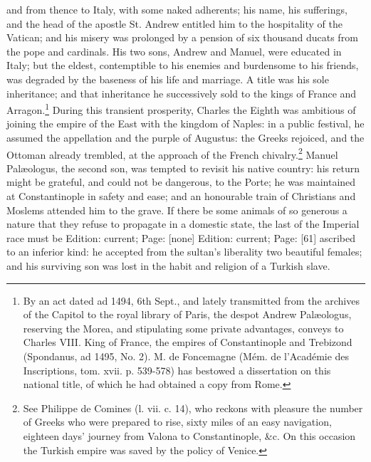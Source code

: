 and from thence to Italy, with some naked adherents; his name, his sufferings, and the head of the apostle St. Andrew entitled him to the hospitality of the Vatican; and his misery was prolonged by a pension of six thousand ducats from the pope and cardinals. His two sons, Andrew and Manuel, were educated in Italy; but the eldest, contemptible to his enemies and burdensome to his friends, was degraded by the baseness of his life and marriage. A title was his sole inheritance; and that inheritance he successively sold to the kings of France and Arragon.\footnote{By an act dated ad 1494, 6th Sept., and lately transmitted from the archives of the Capitol to the royal library of Paris, the despot Andrew Palæologus, reserving the Morea, and stipulating some private advantages, conveys to Charles VIII. King of France, the empires of Constantinople and Trebizond (Spondanus, ad 1495, No. 2). M. de Foncemagne (Mém. de l\texthebrew{}’Académie des Inscriptions, tom. xvii. p. 539-578) has bestowed a dissertation on this national title, of which he had obtained a copy from Rome.} During this transient prosperity, Charles the Eighth was ambitious of joining the empire of the East with the kingdom of Naples: in a public festival, he assumed the appellation and the purple of Augustus: the Greeks rejoiced, and the Ottoman already trembled, at the approach of the French chivalry.\footnote{See Philippe de Comines (l. vii. c. 14), who reckons with pleasure the number of Greeks who were prepared to rise, sixty miles of an easy navigation, eighteen days\texthebrew{}’ journey from Valona to Constantinople, \&c. On this occasion the Turkish empire was saved by the policy of Venice.} Manuel Palæologus, the second son, was tempted to revisit his native country: his return might be grateful, and could not be dangerous, to the Porte; he was maintained at Constantinople in safety and ease; and an honourable train of Christians and Moslems attended him to the grave. If there be some animals of so generous a nature that they refuse to propagate in a domestic state, the last of the Imperial race must be Edition: current; Page: [none] Edition: current; Page: [61] ascribed to an inferior kind: he accepted from the sultan\texthebrew{}’s liberality two beautiful females; and his surviving son was lost in the habit and religion of a Turkish slave.

